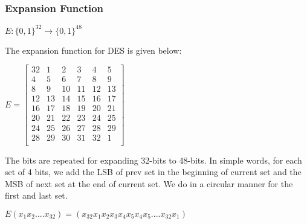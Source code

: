 \documentclass[11pt]{article}
\begin{document}
\subsubsection*{Expansion Function}
\begin{center}
    $E: \{0, 1\}^{32} \rightarrow \{0, 1\}^{48}$\\    
\end{center}

The expansion function for DES is given below:
\begin{center}
    $ E = 
    \begin{bmatrix}
        32 & 1 & 2 & 3 & 4 & 5\\
        4 & 5 & 6 & 7 & 8 & 9\\
        8 & 9 & 10 & 11 & 12 & 13\\
        12 & 13 & 14 & 15 & 16 & 17\\
        16 & 17 & 18 & 19 & 20 & 21\\
        20 & 21 & 22 & 23 & 24 & 25\\
        24 & 25 & 26 & 27 & 28 & 29\\
        28 & 29 & 30 & 31 & 32 & 1\\
    \end{bmatrix}$
\end{center}
The bits are repeated for expanding 32-bits to 48-bits.
In simple words, for each set of 4 bits, we add the LSB of prev set in the beginning of current set and the MSB of next set at the end of current set. We do in a circular manner for the first and last set.
\begin{center}
    $E(x_1x_2....x_{32}) = (x_{32}x_1x_2x_3x_4x_5x_4x_5....x_{32}x_1)$
\end{center}
\end{document}
